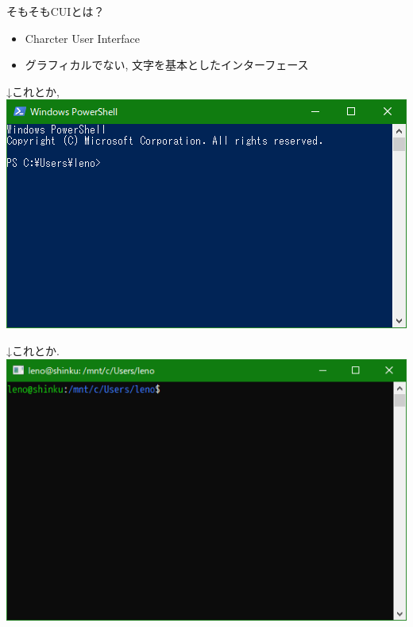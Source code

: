 \documentclass[uplatex, dvipdfmx, unicode]{beamer}
\begin{document}
\begin{frame}
  そもそもCUIとは？
  \begin{itemize}
    \item{Charcter User Interface}
    \item{グラフィカルでない, 文字を基本としたインターフェース}
  \end{itemize}
\end{frame}

\begin{frame}
  \centering
  \Huge{↓これとか,} \\

  \includegraphics[keepaspectratio, scale=.5]{./img/ps.png}
\end{frame}

\begin{frame}
  \centering
  \Huge{↓これとか.} \\

  \includegraphics[keepaspectratio, scale=.5]{./img/bash.png}
\end{frame}
\end{document}
